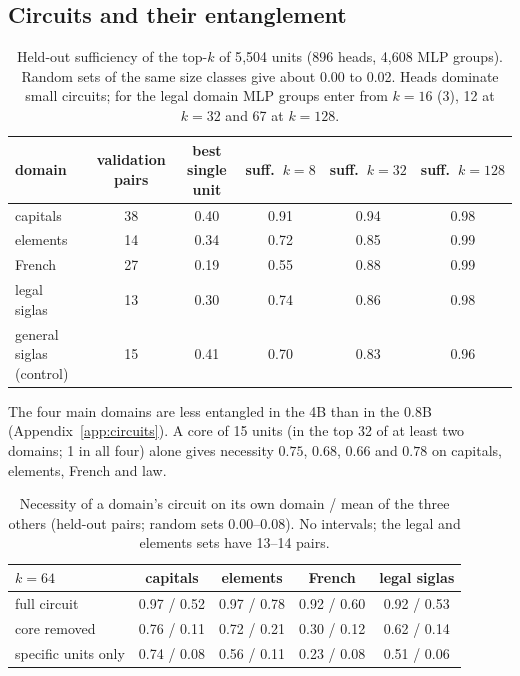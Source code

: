 \documentclass[11pt]{article}
\begin{document}
\subsection{Circuits and their entanglement}
\begin{table}[h]
\centering\small
\begin{tabular}{lccccc}
\toprule
domain & validation pairs & best single unit & suff.\ $k{=}8$ & suff.\ $k{=}32$ & suff.\ $k{=}128$\\
\midrule
capitals & 38 & 0.40 & 0.91 & 0.94 & 0.98\\
elements & 14 & 0.34 & 0.72 & 0.85 & 0.99\\
French & 27 & 0.19 & 0.55 & 0.88 & 0.99\\
legal siglas & 13 & 0.30 & 0.74 & 0.86 & 0.98\\
general siglas (control) & 15 & 0.41 & 0.70 & 0.83 & 0.96\\
\bottomrule
\end{tabular}
\caption{Held-out sufficiency of the top-$k$ of 5{,}504 units (896 heads, 4{,}608 MLP groups). Random sets of the same size classes give about 0.00 to 0.02. Heads dominate small circuits; for the legal domain MLP groups enter from $k{=}16$ (3), 12 at $k{=}32$ and 67 at $k{=}128$.}
\label{tab:c4b}
\end{table}
The four main domains are less entangled in the 4B than in the 0.8B (Appendix~\ref{app:circuits}). A core of 15 units (in the top 32 of at least two domains; 1 in all four) alone gives necessity $0.75$, $0.68$, $0.66$ and $0.78$ on capitals, elements, French and law.
\begin{table}[h]
\centering\small
\begin{tabular}{lcccc}
\toprule
$k=64$ & capitals & elements & French & legal siglas\\
\midrule
full circuit & 0.97 / 0.52 & 0.97 / 0.78 & 0.92 / 0.60 & 0.92 / 0.53\\
core removed & 0.76 / 0.11 & 0.72 / 0.21 & 0.30 / 0.12 & 0.62 / 0.14\\
specific units only & 0.74 / 0.08 & 0.56 / 0.11 & 0.23 / 0.08 & 0.51 / 0.06\\
\bottomrule
\end{tabular}
\caption{Necessity of a domain's circuit on its own domain / mean of the three others (held-out pairs; random sets $0.00$--$0.08$). No intervals; the legal and elements sets have 13--14 pairs.}
\label{tab:e4b}
\end{table}
\end{document}
